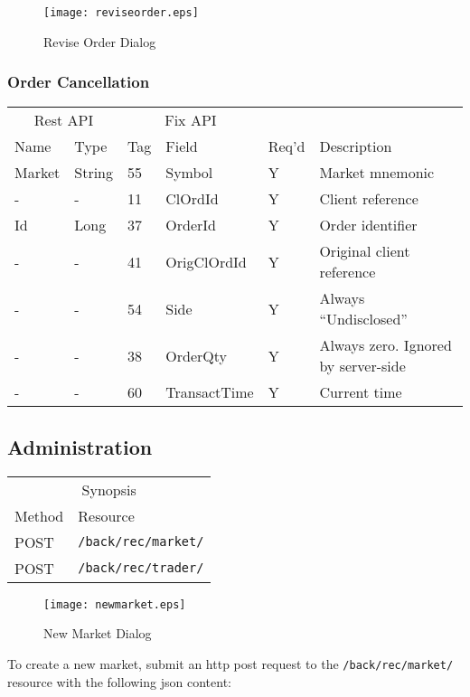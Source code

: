 \documentclass[11pt,a4paper]{article}
\begin{document}
\begin{figure}[H]
\centering
\texttt{[image: reviseorder.eps]}
\caption{Revise Order Dialog}
\end{figure}

\subsubsection{Order Cancellation}

\vspace{5mm}
\begin{tabular}{ll|ll|ll}
\multicolumn{2}{c}{Rest API}&\multicolumn{2}{c}{Fix API}\\
Name&Type&Tag&Field&Req'd&Description\\
\hline
Market&String&55&Symbol&Y&Market mnemonic\\
-&-&11&ClOrdId&Y&Client reference\\
Id&Long&37&OrderId&Y&Order identifier\\
-&-&41&OrigClOrdId&Y&Original client reference\\
-&-&54&Side&Y&Always ``Undisclosed''\\
-&-&38&OrderQty&Y&Always zero. Ignored by server-side\\
-&-&60&TransactTime&Y&Current time\\
\end{tabular}
\vspace{5mm}

\subsection{Administration}

\vspace{5mm}
\begin{tabular}{ll}
\multicolumn{2}{c}{Synopsis}\\
Method&Resource\\
\hline
POST&\texttt{/back/rec/market/}\\
POST&\texttt{/back/rec/trader/}\\
\end{tabular}
\vspace{5mm}

\begin{figure}[H]
\centering
\texttt{[image: newmarket.eps]}
\caption{New Market Dialog}
\end{figure}

To create a new \gls{market}, submit an \gls{http} post request to the \texttt{/back/rec/market/}
resource with the following \gls{json} content:
\end{document}
